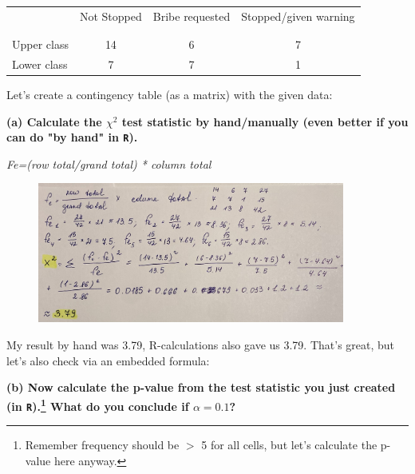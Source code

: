 \documentclass[12pt,letterpaper]{article}
\begin{document}
\newpage
\begin{table}[h!]
	\centering
	\begin{tabular}{l | c c c }
		& Not Stopped & Bribe requested & Stopped/given warning \\
		\\[-1.8ex] 
		\hline \\[-1.8ex]
		Upper class & 14 & 6 & 7 \\
		Lower class & 7 & 7 & 1 \\
		\hline
	\end{tabular}
\end{table}

\begin{enumerate}
Let's create a contingency table (as a matrix) with the given data:
		 
		 
 \textbf{(a)
		Calculate the $\chi^2$ test statistic by hand/manually (even better if you can do "by hand" in \texttt{R}).\\} 

\textit{\textit{Fe=(row total/grand total) * column total}}
	  
	
		\begin{figure}[h!]
		\centering
		\label{fig:chisquared}
		\includegraphics[width=0.9\textwidth]{chisquared.png}
	\end{figure}		
	
My result by hand was 3.79, R-calculations also gave us 3.79. 
That's great, but let's also check via an embedded formula:
  
	\textbf{(b)
	Now calculate the p-value from the test statistic you just created (in \texttt{R}).\footnote{Remember frequency should be $>$ 5 for all cells, but let's calculate the p-value here anyway.}  What do you conclude if $\alpha = 0.1$?\\}
	
		  


\end{enumerate}
\end{document}
